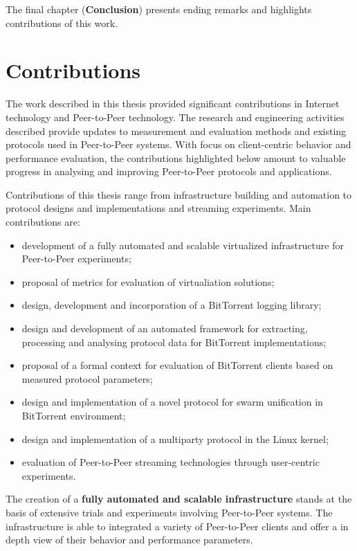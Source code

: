 The final chapter (\textbf{Conclusion}) presents ending remarks and
highlights contributions of this work.

\section{Contributions}
\label{sec:conclusion:contributions}

The work described in this thesis provided significant contributions in
Internet technology and Peer-to-Peer technology. The research and engineering
activities described provide updates to measurement and evaluation methods and
existing protocols used in Peer-to-Peer systems. With focus on client-centric
behavior and performance evaluation, the contributions highlighted below
amount to valuable progress in analysing and improving Peer-to-Peer protocols
and applications.

Contributions of this thesis range from infrastructure building and automation
to protocol designs and implementations and streaming experiments. Main
contributions are:
\begin{itemize}
  \item development of a fully automated and scalable virtualized
  infrastructure for Peer-to-Peer experiments;
  \item proposal of metrics for evaluation of virtualiation solutions;
  \item design, development and incorporation of a BitTorrent logging library;
  \item design and development of an automated framework for extracting,
  processing and analysing protocol data for BitTorrent implementations;
  \item proposal of a formal context for evaluation of BitTorrent clients
  based on measured protocol parameters;
  \item design and implementation of a novel protocol for swarm unification in
  BitTorrent environment;
  \item design and implementation of a multiparty protocol in the Linux
  kernel;
  \item evaluation of Peer-to-Peer streaming technologies through user-centric
  experiments.
\end{itemize}

The creation of a \textbf{fully automated and scalable infrastructure} stands
at the basis of extensive trials and experiments involving Peer-to-Peer
systems. The infrastructure is able to integrated a variety of Peer-to-Peer
clients and offer a in depth view of their behavior and performance
parameters.

